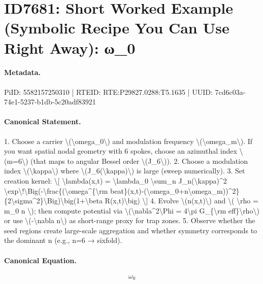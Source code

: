 \section*{ID7681: Short Worked Example (Symbolic Recipe You Can Use Right Away): ω\_0}
\paragraph{Metadata.}
PiID: 5582157250310 | RTEID: RTE:P29827.0288:T5.1635 | UUID: 7cd6c03a-74e1-5237-b1db-5c20adf83921

\paragraph{Canonical Statement.}
1. Choose a carrier \textbackslash{}(\textbackslash{}omega\_0\textbackslash{}) and modulation frequency \textbackslash{}(\textbackslash{}omega\_m\textbackslash{}). If you want spatial nodal geometry with 6 spokes, choose an azimuthal index \textbackslash{}(m=6\textbackslash{}) (that maps to angular Bessel order \textbackslash{}(J\_6\textbackslash{})). 2. Choose a modulation index \textbackslash{}(\textbackslash{}kappa\textbackslash{}) where \textbackslash{}(J\_6(\textbackslash{}kappa)\textbackslash{}) is large (sweep numerically). 3. Set creation kernel: \textbackslash{}[ \textbackslash{}lambda(x,t) = \textbackslash{}lambda\_0 \textbackslash{}sum\_n J\_n(\textbackslash{}kappa)\textasciicircum{}2 \textbackslash{}exp\textbackslash{}!\textbackslash{}Big(-\textbackslash{}frac\{(\textbackslash{}omega\textasciicircum{}\{\textbackslash{}rm beat\}(x,t)-(\textbackslash{}omega\_0+n\textbackslash{}omega\_m))\textasciicircum{}2\}\{2\textbackslash{}sigma\textasciicircum{}2\}\textbackslash{}Big)\textbackslash{}big(1+\textbackslash{}beta R(x,t)\textbackslash{}big) \textbackslash{}] 4. Evolve \textbackslash{}(n(x,t)\textbackslash{}) and \textbackslash{}( \textbackslash{}rho = m\_0 n \textbackslash{}); then compute potential via \textbackslash{}(\textbackslash{}nabla\textasciicircum{}2\textbackslash{}Phi = 4\textbackslash{}pi G\_\{\textbackslash{}rm eff\}\textbackslash{}rho\textbackslash{}) or use \textbackslash{}(-\textbackslash{}nabla n\textbackslash{}) as short-range proxy for trap zones. 5. Observe whether the seed regions create large-scale aggregation and whether symmetry corresponds to the dominant n (e.g., n=6 → sixfold).

\paragraph{Canonical Equation.}
\[
\omega_0
\]

